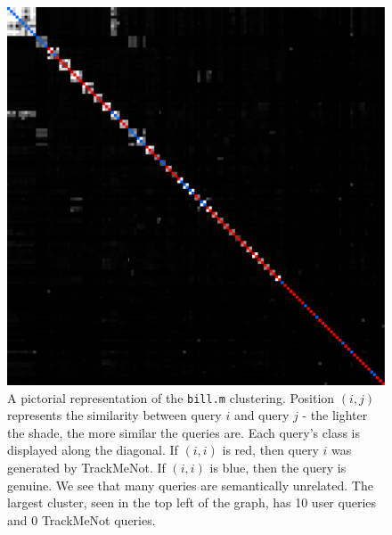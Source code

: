 \documentclass{llncs}
\begin{document}
\begin{multicols}{2}
  \begin{figure}[h]
    \centering
    \includegraphics[width=\linewidth]{disco_bill_131}
    \caption{A pictorial representation of the \texttt{bill.m}
      clustering. Position $(i,j)$ represents the similarity between
      query $i$ and query $j$ - the lighter the shade, the more
      similar the queries are. Each query's class is displayed along
      the diagonal. If $(i,i)$ is red, then query $i$ was generated by
      TrackMeNot. If $(i,i)$ is blue, then the query is genuine. We
      see that many queries are semantically unrelated. The largest
      cluster, seen in the top left of the graph, has 10 user queries
      and 0 TrackMeNot queries.}
    \label{fig:disco.bill}
  \end{figure}


\end{multicols}
\end{document}
